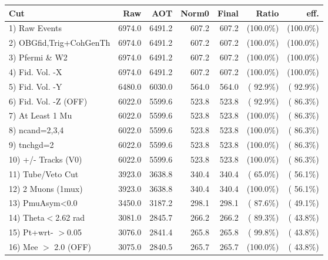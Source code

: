  \begin{table}[h!]\centering
 \begin{tabular}{||l||r|r|r|r|r|r||}
 \hline
 \hline
 Cut & Raw & AOT & Norm0 & Final & Ratio & eff.       \\
 \hline
  1) Raw Events           &       6974.0 &       6491.2 &        607.2 &        607.2 & (100.0\%) & (100.0\%) \\
  2) OBGfid,Trig+CohGenTh &       6974.0 &       6491.2 &        607.2 &        607.2 & (100.0\%) & (100.0\%) \\
  3) Pfermi \& W2         &       6974.0 &       6491.2 &        607.2 &        607.2 & (100.0\%) & (100.0\%) \\
  4) Fid. Vol. -X         &       6974.0 &       6491.2 &        607.2 &        607.2 & (100.0\%) & (100.0\%) \\
  5) Fid. Vol. -Y         &       6480.0 &       6030.0 &        564.0 &        564.0 & ( 92.9\%) & ( 92.9\%) \\
  6) Fid. Vol. -Z (OFF)   &       6022.0 &       5599.6 &        523.8 &        523.8 & ( 92.9\%) & ( 86.3\%) \\
  7) At Least 1 Mu        &       6022.0 &       5599.6 &        523.8 &        523.8 & (100.0\%) & ( 86.3\%) \\
  8) ncand=2,3,4          &       6022.0 &       5599.6 &        523.8 &        523.8 & (100.0\%) & ( 86.3\%) \\
  9) tnchgd=2             &       6022.0 &       5599.6 &        523.8 &        523.8 & (100.0\%) & ( 86.3\%) \\
 10) +/- Tracks (V0)      &       6022.0 &       5599.6 &        523.8 &        523.8 & (100.0\%) & ( 86.3\%) \\
 11) Tube/Veto Cut        &       3923.0 &       3638.8 &        340.4 &        340.4 & ( 65.0\%) & ( 56.1\%) \\
 12) 2 Muons (1mux)       &       3923.0 &       3638.8 &        340.4 &        340.4 & (100.0\%) & ( 56.1\%) \\
 13) PmuAsym<0.0          &       3450.0 &       3187.2 &        298.1 &        298.1 & ( 87.6\%) & ( 49.1\%) \\
 14) Theta$<$2.62 rad     &       3081.0 &       2845.7 &        266.2 &        266.2 & ( 89.3\%) & ( 43.8\%) \\
 15) Pt+wrt- $>$0.05      &       3076.0 &       2841.4 &        265.8 &        265.8 & ( 99.8\%) & ( 43.8\%) \\
 16) Mee $>$ 2.0  (OFF)   &       3075.0 &       2840.5 &        265.7 &        265.7 & (100.0\%) & ( 43.8\%) \\

\end{tabular}
\end{table}
